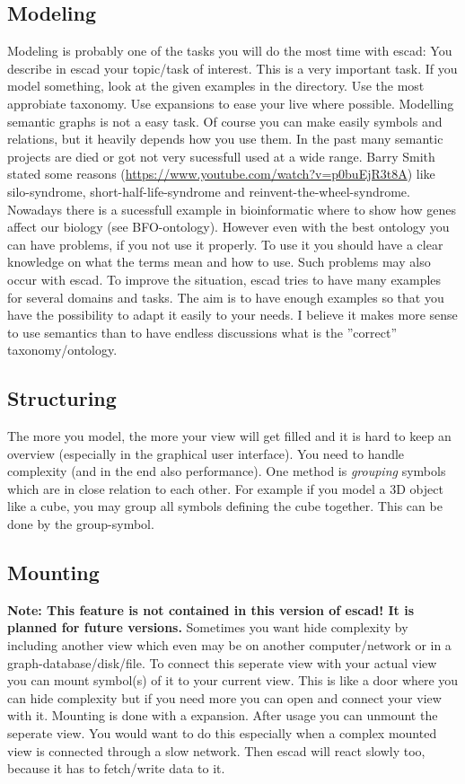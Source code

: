 \documentclass[a4paper, 12pt, openany]{scrbook}
\begin{document}
\subsection{Modeling}
Modeling is probably one of the tasks you will do the most time with escad: You describe in escad your topic/task of interest. This is a very important task. If you model something, look at the given examples in the  directory. Use the most approbiate taxonomy. Use expansions to ease your live where possible.
Modelling semantic graphs is not a easy task. Of course you can make easily symbols and relations, but it heavily depends how you use them. In the past many semantic projects are died or got not very sucessfull used at a wide range. Barry Smith stated some reasons (\url{https://www.youtube.com/watch?v=p0buEjR3t8A}) like silo-syndrome, short-half-life-syndrome and reinvent-the-wheel-syndrome. Nowadays there is a sucessfull example in bioinformatic where to show how genes affect our biology (see BFO-ontology). However even with the best ontology you can have problems, if you not use it properly. To use it you should have a clear knowledge on what the terms mean and how to use.
Such problems may also occur with escad. To improve the situation, escad tries to have many examples for several domains and tasks. The aim is to have enough examples so that you have the possibility to adapt it easily to your needs. I believe it makes more sense to use semantics than to have endless discussions what is the ''correct'' taxonomy/ontology.
\subsection{Structuring}
The more you model, the more your view will get filled and it is hard to keep an overview (especially in the graphical user interface). You need to handle complexity (and in the end also performance). One method is \emph{grouping} symbols which are in close relation to each other. For example if you model a 3D object like a cube, you may group all symbols defining the cube together. This can be done by the group-symbol.
\subsection{Mounting}
\textbf{Note: This feature is not contained in this version of escad! It is planned for future versions.} Sometimes you want hide complexity by including another view which even may be on another computer/network or in a graph-database/disk/file. To connect this seperate view with your actual view you can mount symbol(s) of it to your current view. This is like a door where you can hide complexity but if you need more you can open and connect your view with it. Mounting is done with a expansion. After usage you can unmount the seperate view. You would want to do this especially when a complex mounted view is connected through a slow network. Then escad will react slowly too, because it has to fetch/write data to it.
\end{document}
